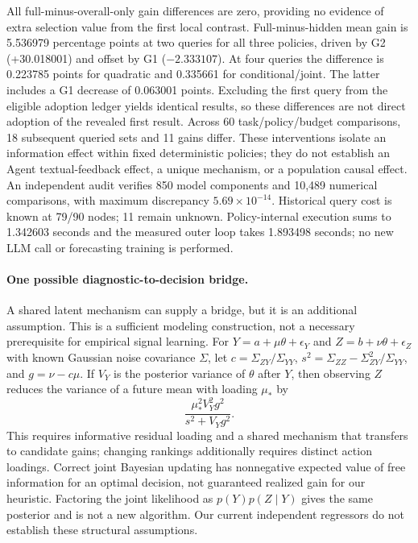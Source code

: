 \documentclass[10pt]{article}
\begin{document}
All full-minus-overall-only gain differences are zero, providing no evidence of extra selection value from the first local contrast.
Full-minus-hidden mean gain is 5.536979 percentage points at two queries for all three policies, driven by G2 (+30.018001) and offset by G1 ($-2.333107$).
At four queries the difference is 0.223785 points for quadratic and 0.335661 for conditional/joint.
The latter includes a G1 decrease of 0.063001 points.
Excluding the first query from the eligible adoption ledger yields identical results, so these differences are not direct adoption of the revealed first result.
Across 60 task/policy/budget comparisons, 18 subsequent queried sets and 11 gains differ.
These interventions isolate an information effect within fixed deterministic policies; they do not establish an Agent textual-feedback effect, a unique mechanism, or a population causal effect.
An independent audit verifies 850 model components and 10,489 numerical comparisons, with maximum discrepancy $5.69\times10^{-14}$.
Historical query cost is known at 79/90 nodes; 11 remain unknown.
Policy-internal execution sums to 1.342603 seconds and the measured outer loop takes 1.893498 seconds; no new LLM call or forecasting training is performed.

\paragraph{One possible diagnostic-to-decision bridge.}
A shared latent mechanism can supply a bridge, but it is an additional assumption.
This is a sufficient modeling construction, not a necessary prerequisite for empirical signal learning.
For $Y=a+\mu\theta+\epsilon_Y$ and $Z=b+\nu\theta+\epsilon_Z$ with known Gaussian noise covariance $\Sigma$, let $c=\Sigma_{ZY}/\Sigma_{YY}$, $s^2=\Sigma_{ZZ}-\Sigma_{ZY}^2/\Sigma_{YY}$, and $g=\nu-c\mu$.
If $V_Y$ is the posterior variance of $\theta$ after $Y$, then observing $Z$ reduces the variance of a future mean with loading $\mu_*$ by
\[
 \frac{\mu_*^2 V_Y^2 g^2}{s^2+V_Y g^2}.
\]
This requires informative residual loading and a shared mechanism that transfers to candidate gains; changing rankings additionally requires distinct action loadings.
Correct joint Bayesian updating has nonnegative expected value of free information for an optimal decision, not guaranteed realized gain for our heuristic.
Factoring the joint likelihood as $p(Y)p(Z\mid Y)$ gives the same posterior and is not a new algorithm.
Our current independent regressors do not establish these structural assumptions.
\end{document}
